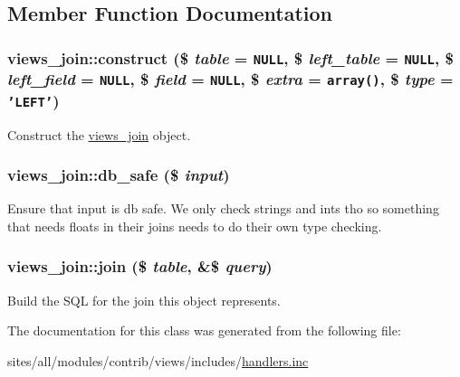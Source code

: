 \subsection{Member Function Documentation}
\hypertarget{classviews__join_c6c6e70389e0c59e4b068903ef4950b9}{
\subsubsection[{construct}]{\setlength{\rightskip}{0pt plus 5cm}views\_\-join::construct (\$ {\em table} = {\tt NULL}, \/  \$ {\em left\_\-table} = {\tt NULL}, \/  \$ {\em left\_\-field} = {\tt NULL}, \/  \$ {\em field} = {\tt NULL}, \/  \$ {\em extra} = {\tt array()}, \/  \$ {\em type} = {\tt 'LEFT'})}}
\label{classviews__join_c6c6e70389e0c59e4b068903ef4950b9}


Construct the \hyperlink{classviews__join}{views\_\-join} object. \hypertarget{classviews__join_754d61d9f26180fb155238475122308d}{
\subsubsection[{db\_\-safe}]{\setlength{\rightskip}{0pt plus 5cm}views\_\-join::db\_\-safe (\$ {\em input})}}
\label{classviews__join_754d61d9f26180fb155238475122308d}


Ensure that input is db safe. We only check strings and ints tho so something that needs floats in their joins needs to do their own type checking. \hypertarget{classviews__join_9314539b413d4eaf3c7b4fc7707ead01}{
\subsubsection[{join}]{\setlength{\rightskip}{0pt plus 5cm}views\_\-join::join (\$ {\em table}, \/  \&\$ {\em query})}}
\label{classviews__join_9314539b413d4eaf3c7b4fc7707ead01}


Build the SQL for the join this object represents. 

The documentation for this class was generated from the following file:\begin{CompactItemize}
\item 
sites/all/modules/contrib/views/includes/\hyperlink{handlers_8inc}{handlers.inc}\end{CompactItemize}
